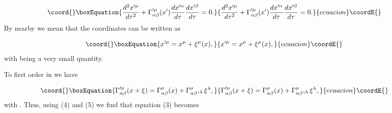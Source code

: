 \documentclass[a4paper,12pt]{article}
\begin{document}
\begin{equation}\coord{}\boxEquation{
\frac{d^{2}x^{\prime\mu}}{d\tau^{2}}+\Gamma_{\alpha\beta}^{\prime\mu
}(x^{\prime})\frac{dx^{\prime\alpha}}{d\tau}\frac{dx^{\prime\beta}}{d\tau}=0.
\label{3}
}{
\frac{d^{2}x^{\prime\mu}}{d\tau^{2}}+\Gamma_{\alpha\beta}^{\prime\mu
}(x^{\prime})\frac{dx^{\prime\alpha}}{d\tau}\frac{dx^{\prime\beta}}{d\tau}=0.
}{ecuacion}\coordE{}\end{equation}
By nearby we mean that the coordinates \coordHE{} can be written
as

\begin{equation}\coord{}\boxEquation{
x^{\prime \mu }=x^{\mu }+\xi ^{\mu }(x),  \label{4}
}{
x^{\prime \mu }=x^{\mu }+\xi ^{\mu }(x),  }{ecuacion}\coordE{}\end{equation}
with \myHighlight{$\shortmid \xi ^{\mu }\shortmid $}\coordHE{} being a very small quantity.

To first order in \myHighlight{$\xi ^{\mu }$}\coordHE{} we have

\begin{equation}\coord{}\boxEquation{
\Gamma _{\alpha \beta }^{\prime \mu }(x+\xi )=\Gamma _{\alpha \beta }^{\mu
}(x)+\Gamma _{\alpha \beta }^{\mu },_{\lambda }\xi ^{\lambda },  \label{5}
}{
\Gamma _{\alpha \beta }^{\prime \mu }(x+\xi )=\Gamma _{\alpha \beta }^{\mu
}(x)+\Gamma _{\alpha \beta }^{\mu },_{\lambda }\xi ^{\lambda },  }{ecuacion}\coordE{}\end{equation}
with \coordHE{}. Thus, using (4) and (5) we
find that equation (3) becomes
\end{document}
